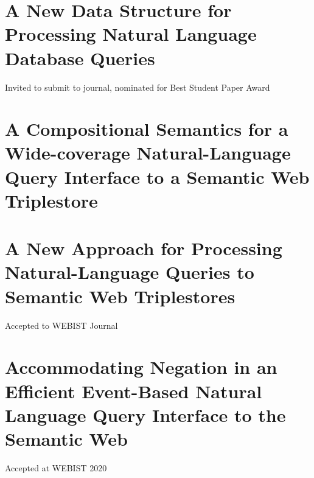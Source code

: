 \documentclass[../main.tex]{subfiles}
\begin{document}
\begin{refsection}

\section{A New Data Structure for Processing Natural Language Database Queries}


Invited to submit to journal, nominated for Best Student Paper Award

\section{A Compositional Semantics for a Wide-coverage Natural-Language Query Interface to a Semantic Web Triplestore}


\section{A New Approach for Processing Natural-Language Queries to Semantic Web Triplestores}


Accepted to WEBIST Journal

\section{Accommodating Negation in an Efficient Event-Based Natural Language Query Interface to the Semantic Web}


Accepted at WEBIST 2020


\printbibliography[heading=subbibintoc]
\end{refsection}
\end{document}
